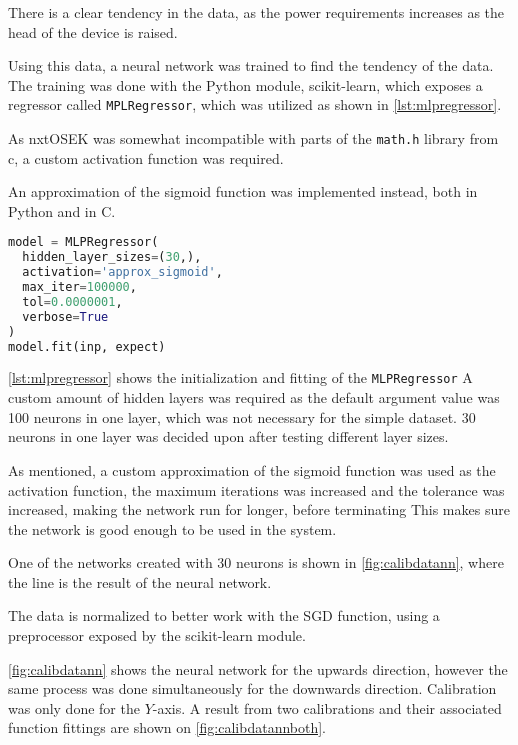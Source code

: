 
There is a clear tendency in the data, as the power requirements increases as the head of the device is raised.

Using this data, a neural network was trained to find the tendency of the data.
The training was done with the Python module, scikit-learn\cite{scikit-learn}, which exposes a regressor called \texttt{MPLRegressor}, which was utilized as shown in \autoref{lst:mlpregressor}.


As nxtOSEK was somewhat incompatible with parts of the \texttt{math.h} library from c, a custom activation function was required.

An approximation of the sigmoid function was implemented instead, both in Python and in C.

\begin{lstlisting}[language=python,label={lst:mlpregressor},caption={Training a MLPRegressor with scikit}]
model = MLPRegressor(
  hidden_layer_sizes=(30,),
  activation='approx_sigmoid',
  max_iter=100000,
  tol=0.0000001,
  verbose=True
)
model.fit(inp, expect)

\end{lstlisting}

\autoref{lst:mlpregressor} shows the initialization and fitting of the \texttt{MLPRegressor} 
A custom amount of hidden layers was required as the default argument value was 100 neurons in one layer, which was not necessary for the simple dataset.
30 neurons in one layer was decided upon after testing different layer sizes.

As mentioned, a custom approximation of the sigmoid function was used as the activation function, the maximum iterations was increased and the tolerance was increased, making the network run for longer, before terminating
This makes sure the network is good enough to be used in the system.

One of the networks created with 30 neurons is shown in \autoref{fig:calibdatann}, where the line is the result of the neural network.

The data is normalized to better work with the SGD function, using a preprocessor exposed by the scikit-learn module.


\autoref{fig:calibdatann} shows the neural network for the upwards direction, however the same process was done simultaneously for the downwards direction.
Calibration was only done for the $Y$-axis.
A result from two calibrations and their associated function fittings are shown on \autoref{fig:calibdatannboth}.

